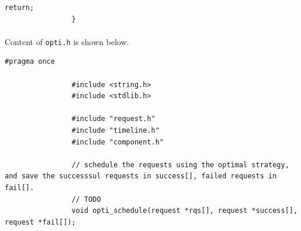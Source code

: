 \documentclass{article}
\begin{document}
\begin{Verbatim}[gobble=8]
                    return;
                }
            \end{Verbatim}
            \paragraph{}
                Content of \texttt{opti.h} is shown below.
            \begin{Verbatim}[gobble=8]
                #pragma once

                #include <string.h>
                #include <stdlib.h>
                
                #include "request.h"
                #include "timeline.h"
                #include "component.h"
                
                // schedule the requests using the optimal strategy, and save the successsul requests in success[], failed requests in fail[].
                // TODO
                void opti_schedule(request *rqs[], request *success[], request *fail[]);
            \end{Verbatim}
\end{document}
